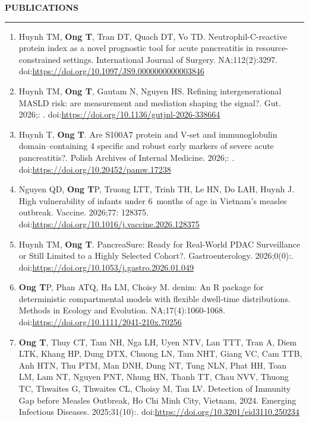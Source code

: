 \documentclass[
  12pt,
  a4paper,
]{article}
\providecommand{\tightlist}{%
  \setlength{\itemsep}{0pt}\setlength{\parskip}{0pt}}
\begin{document}
\begin{large}{\bf PUBLICATIONS}
  \vspace{3pt}
  \hrule
\end{large}

\begin{enumerate}
\def\labelenumi{\arabic{enumi}.}
\tightlist
\item
  Huynh TM, \textbf{Ong T}, Tran DT, Quach DT, Vo TD.
  Neutrophil-C-reactive protein index as a novel prognostic tool for
  acute pancreatitis in resource-constrained settings. International
  Journal of Surgery. NA;112(2):3297.
  doi:\url{https://doi.org/10.1097/JS9.0000000000003846}
\item
  Huynh TM, \textbf{Ong T}, Gautam N, Nguyen HS. Refining
  intergenerational MASLD risk: are measurement and mediation shaping
  the signal?. Gut. 2026;: .
  doi:\url{https://doi.org/10.1136/gutjnl-2026-338664}
\item
  Huynh T, \textbf{Ong T}. Are S100A7 protein and V-set and
  immunoglobulin domain--containing 4 specific and robust early markers
  of severe acute pancreatitis?. Polish Archives of Internal Medicine.
  2026;: . doi:\url{https://doi.org/10.20452/pamw.17238}
\item
  Nguyen QD, \textbf{Ong T}P, Truong LTT, Trinh TH, Le HN, Do LAH, Huynh
  J. High vulnerability of infants under 6~months of age in Vietnam's
  measles outbreak. Vaccine. 2026;77: 128375.
  doi:\url{https://doi.org/10.1016/j.vaccine.2026.128375}
\item
  Huynh TM, \textbf{Ong T}. PancreaSure: Ready for Real-World PDAC
  Surveillance or Still Limited to a Highly Selected Cohort?.
  Gastroenterology. 2026;0(0):.
  doi:\url{https://doi.org/10.1053/j.gastro.2026.01.049}
\item
  \textbf{Ong T}P, Phan ATQ, Ha LM, Choisy M. denim: An R package for
  deterministic compartmental models with flexible dwell-time
  distributions. Methods in Ecology and Evolution. NA;17(4):1060-1068.
  doi:\url{https://doi.org/10.1111/2041-210x.70256}
\item
  \textbf{Ong T}, Thuy CT, Tam NH, Nga LH, Uyen NTV, Lan TTT, Tran A,
  Diem LTK, Khang HP, Dung DTX, Chuong LN, Tam NHT, Giang VC, Cam TTB,
  Anh HTN, Thu PTM, Man DNH, Dung NT, Tung NLN, Phat HH, Toan LM, Lam
  NT, Nguyen PNT, Nhung HN, Thanh TT, Chau NVV, Thuong TC, Thwaites G,
  Thwaites CL, Choisy M, Tan LV. Detection of Immunity Gap before
  Measles Outbreak, Ho Chi Minh City, Vietnam, 2024. Emerging Infectious
  Diseases. 2025;31(10):.
  doi:\url{https://doi.org/10.3201/eid3110.250234}

\end{enumerate}
\end{document}

